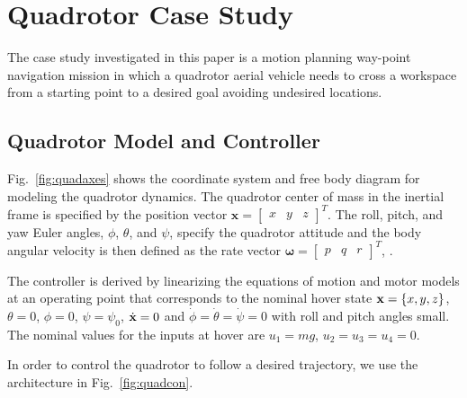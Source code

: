 \section{Quadrotor Case Study}
\label{sec:quad}
The case study investigated in this paper is a motion planning way-point navigation mission in which a quadrotor aerial vehicle needs to cross a workspace from a starting point to a desired goal avoiding undesired locations.

\subsection{Quadrotor Model and Controller}
Fig.~\ref{fig:quadaxes} shows the coordinate system and free body diagram for modeling the quadrotor dynamics. 
The quadrotor center of mass in the inertial frame is specified by the position vector $\mathbf{x} = \begin{bmatrix}x & y & z\end{bmatrix}^T$. The roll, pitch, and yaw Euler angles, $\phi$, $\theta$, and $\psi$, specify the quadrotor attitude and the body angular velocity is then defined as the rate vector $\mathbf{\omega} = \begin{bmatrix}p & q & r\end{bmatrix}^T$, \cite{bezzo2014cooperative, michael2010grasp}.


The controller is derived by linearizing the equations of motion and motor models at an operating point that corresponds to the nominal hover state ${\bf x} = \{x, y, z\}$, $\theta = 0$, $\phi = 0$, $\psi = \psi_0$, ${\dot{\bf x} = 0}$ and $\dot{\phi} = \dot{\theta} = \dot{\psi} = 0$ with roll and pitch angles small. The nominal values for the inputs at hover are $u_1 = mg$, $u_2 = u_3 = u_4 = 0$.

In order to control the quadrotor to follow a desired trajectory, we use the architecture in Fig.~\ref{fig:quadcon}.


